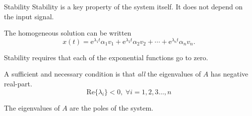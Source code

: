 \documentclass[presentation,aspectratio=169]{beamer}
\begin{document}
\begin{frame}[label={sec:orgd28113a}]{Stability}
Stability is a key property of the system itself. It does not depend on the input signal.

The homogeneous solution can be written
   \[ x(t) = \mathrm{e}^{\lambda_1 t}\alpha_1v_1 + \mathrm{e}^{\lambda_2 t}\alpha_2v_2 + \cdots + \mathrm{e}^{\lambda_n t}\alpha_nv_n.\]

\pause

Stability requires that \alert{each} of the exponential functions go to zero.

\pause

\begin{center}
A sufficient and necessary condition is that \emph{all} the eigenvalues of $A$ has negative real-part. \[ \mathrm{Re}\{\lambda_i\} < 0, \; \forall i=1,2,3\ldots, n\]
\end{center}

The eigenvalues of \(A\) are the \alert{poles} of the system.
\end{frame}
\end{document}
